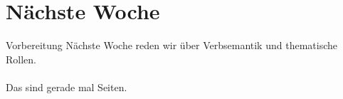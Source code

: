 \section{Nächste Woche}

\begin{frame}
  {Vorbereitung}
  \onslide<+->
  \onslide<+->
  \centering 
  \large
  Nächste Woche reden wir über Verbsemantik und thematische Rollen.\\
  \onslide<+->
  \Zeile
  \\
  \onslide<+->
  \Viertelzeile
  Das sind gerade mal  Seiten.
\end{frame}
